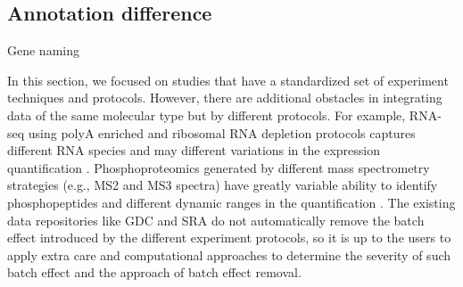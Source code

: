 \subsection{Annotation difference}


Gene naming \cite{fujiyoshik_oginos:OpinionStandardizing2021}
\cite{brufordea_tweedies:GuidelinesHuman2020}



In this section, we focused on studies that have a standardized set of experiment techniques and protocols. However, there are additional obstacles in integrating data of the same molecular type but by different protocols. For example, RNA-seq using polyA enriched and ribosomal RNA depletion protocols captures different RNA species and may different variations in the expression quantification \cite{cuip_yuj:ComparisonRibominus2010,chenl_chenl:PairedRRNAdepleted2020}. Phosphoproteomics generated by different mass spectrometry strategies (e.g., MS2 and MS3 spectra) have greatly variable ability to identify phosphopeptides and different dynamic ranges in the quantification \cite{ulintzpj_nesvizhskiiai:ComparisonMS2only2009}. The existing data repositories like GDC and SRA do not automatically remove the batch effect introduced by the different experiment protocols, so it is up to the users to apply extra care and computational approaches to determine the severity of such batch effect and the approach of batch effect removal.



